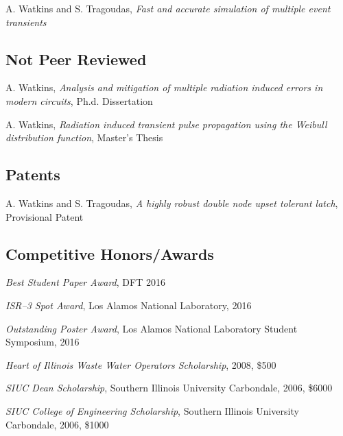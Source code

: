 \documentclass[letterpaper]{article}
\renewenvironment{itemize}{
  \begin{list}{}{
    \setlength{\leftmargin}{1.5em}
  }
}{
  \end{list}
}
\begin{document}
\begin{itemize}
\item A. Watkins and S. Tragoudas, \emph{Fast and accurate simulation of multiple event transients}

\end{itemize}

\subsection*{Not Peer Reviewed}

\begin{itemize}
	\item A. Watkins, \emph{Analysis and mitigation of multiple radiation induced errors in modern circuits}, Ph.d. Dissertation
	
	\item A. Watkins, \emph{Radiation induced transient pulse propagation using the Weibull distribution function}, Master's Thesis
\end{itemize}

\subsection*{Patents}

\begin{itemize}
	\item A. Watkins and S. Tragoudas, \emph{A highly robust double node upset tolerant latch}, Provisional Patent 
\end{itemize}

\subsection*{Competitive Honors/Awards}

\begin{itemize}
	
	\item \emph{Best Student Paper Award}, DFT 2016
	\item \emph{ISR--3 Spot Award}, Los Alamos National Laboratory, 2016
	\item \emph{Outstanding Poster Award}, Los Alamos National Laboratory Student Symposium, 2016
	\item \emph{Heart of Illinois Waste Water Operators Scholarship}, 2008, \$500
	\item \emph{SIUC Dean Scholarship}, Southern Illinois University Carbondale, 2006, \$6000
	\item \emph{SIUC College of Engineering Scholarship}, Southern Illinois University Carbondale, 2006, \$1000
	
\end{itemize}
\end{document}
